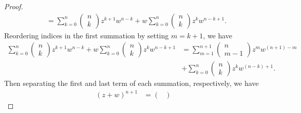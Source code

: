 \documentclass[a4paper]{article}
\begin{document}
\begin{proof}
\begin{align*}
                        &=  \sum_{ k=0  }^{ n } \begin{pmatrix} 
                                   n \\ 
                                   k 
                                  \end{pmatrix} z^{k+1} w^{n-k} + w \sum_{ k=0  }^{ n } \begin{pmatrix} 
                                             n \\
                                             k 
                                            \end{pmatrix} z^{k} w^{n-k + 1}.  
        \end{align*}
        Reordering indices in the first summation by setting \( m = k +1 \), we have
        \begin{align*}
            \sum_{ k=0  }^{ n } \begin{pmatrix} 
                                   n \\ 
                                   k 
                                  \end{pmatrix} z^{k+1} w^{n-k} + w \sum_{ k=0  }^{ n } \begin{pmatrix} 
                                             n \\
                                             k 
                                            \end{pmatrix} z^{k} w^{n-k + 1} &= \sum_{ m=1  }^{ n+1 } \begin{pmatrix} 
                                                       n \\
                                                       m-1
                                                      \end{pmatrix}  z^{m} w^{(n+1) -m} \\
                                                      &+ \sum_{ k=0  }^{ n } \begin{pmatrix} 
                                                                 n \\
                                                                 k 
                                                                \end{pmatrix}  z^{k} w^{(n-k) + 1}.
        \end{align*}
       Then separating the first and last term of each summation, respectively, we have
        \begin{align*}
            (z + w)^{n+1} &=  \begin{pmatrix} 

\end{pmatrix}
\end{align*}
\end{proof}
\end{document}
